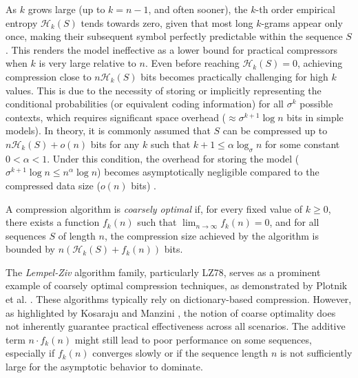 \begin{remark}
    As $k$ grows large (up to $k=n-1$, and often sooner), the $k$-th order empirical entropy $\mathcal{H}_k(S)$ tends towards zero, given that most long $k$-grams appear only once, making their subsequent symbol perfectly predictable within the sequence $S$. This renders the model ineffective as a lower bound for practical compressors when $k$ is very large relative to $n$. Even before reaching $\mathcal{H}_k(S)=0$, achieving compression close to $n\mathcal{H}_k(S)$ bits becomes practically challenging for high $k$ values. This is due to the necessity of storing or implicitly representing the conditional probabilities (or equivalent coding information) for all $\sigma^k$ possible contexts, which requires significant space overhead ($\approx \sigma^{k+1} \log n$ bits in simple models). In theory, it is commonly assumed that $S$ can be compressed up to $n \mathcal{H}_k(S) + o(n)$ bits for any $k$ such that $k+1 \leq \alpha \log_\sigma n$ for some constant $0 < \alpha < 1$. Under this condition, the overhead for storing the model ($\sigma^{k+1} \log n \leq n^\alpha \log n$) becomes asymptotically negligible compared to the compressed data size ($o(n)$ bits) \cite{navarro2016compact}.
\end{remark}

\begin{definition} \label{def:coarsely_optimal_compression_algorithm}
    A compression algorithm is \emph{coarsely optimal} if, for every fixed value of $k \ge 0$, there exists a function $f_k(n)$ such that $\lim_{n\to\infty} f_k(n) = 0$, and for all sequences $S$ of length $n$, the compression size achieved by the algorithm is bounded by $n (\mathcal{H}_k(S) + f_k(n))$ bits.
\end{definition}

\noindent The \emph{Lempel-Ziv} algorithm family, particularly LZ78, serves as a prominent example of coarsely optimal compression techniques, as demonstrated by Plotnik et al. \cite{plotnik1992upper}. These algorithms typically rely on dictionary-based compression. However, as highlighted by Kosaraju and Manzini \cite{kosaraju2000compression}, the notion of coarse optimality does not inherently guarantee practical effectiveness across all scenarios. The additive term $n \cdot f_k(n)$ might still lead to poor performance on some sequences, especially if $f_k(n)$ converges slowly or if the sequence length $n$ is not sufficiently large for the asymptotic behavior to dominate.


